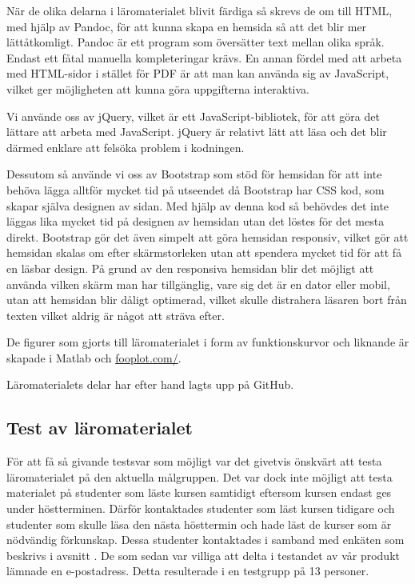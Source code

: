 \documentclass[12pt,a4paper,twoside,openright]{article}
\begin{document}
När de olika delarna i läromaterialet blivit färdiga så skrevs de om
till HTML, med hjälp av Pandoc, för att kunna skapa en hemsida så att
det blir mer lätt\-åtkomligt. Pandoc är ett program som översätter
text mellan olika språk. Endast ett fåtal manuella kompleteringar
krävs.  En annan fördel med att arbeta med HTML-sidor i stället för
PDF är att man kan använda sig av JavaScript, vilket ger möjligheten
att kunna göra uppgifterna interaktiva.

Vi använde oss av jQuery, vilket är ett JavaScript-bibliotek, för att
göra det lättare att arbeta med JavaScript. jQuery är relativt lätt
att läsa och det blir därmed enklare att felsöka problem i kodningen.

Dessutom så använde vi oss av Bootstrap som stöd för hemsidan för att inte
behöva lägga alltför mycket tid på utseendet då Bootstrap har CSS kod,
som skapar själva designen av sidan. Med hjälp av denna kod så
behövdes det inte läggas lika mycket tid på designen av hemsidan utan det
löstes för det mesta direkt. Bootstrap gör det även simpelt att göra hemsidan
responsiv, vilket gör att hemsidan skalas om efter skärmstorleken utan att
spendera mycket tid för att få en läsbar design. På grund av den responsiva
hemsidan blir det möjligt att använda vilken skärm man har tillgänglig, vare
sig det är en dator eller mobil, utan att hemsidan blir dåligt optimerad,
vilket skulle distrahera läsaren bort från texten vilket aldrig är något att
sträva efter.

De figurer som gjorts till läromaterialet i form av funktionskurvor
och liknande är skapade i Matlab och \url{fooplot.com/}.

Läromaterialets delar har efter hand lagts upp på GitHub.

\subsection{Test av läromaterialet}
\label{sec:test}

För att få så givande testsvar som möjligt var det givetvis önskvärt
att testa läromaterialet på den aktuella målgruppen. Det var dock inte
möjligt att testa materialet på studenter som läste kursen samtidigt
eftersom kursen endast ges under höstterminen. Därför kontaktades
studenter som läst kursen tidigare och studenter som skulle läsa den
nästa hösttermin och hade läst de kurser som är nödvändig förkunskap.
Dessa studenter kontaktades i samband med enkäten som beskrivs i
avsnitt . De som sedan var villiga att
delta i testandet av vår produkt lämnade en e-postadress. Detta
resulterade i en testgrupp på 13 personer.
\end{document}
